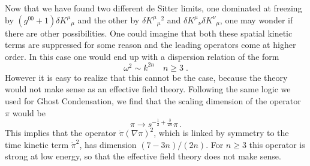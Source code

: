 \documentclass[12pt,letterpaper]{article}
\begin{document}
{%



Now that we have found two different de Sitter limits, one dominated
at freezing by $(g^{00}+1)\delta K^\mu {}_\mu $ and the other by
$\delta K^\mu {}_\mu {}^2$ and $\delta K^\mu {}_\nu \delta K^\nu
{}_\mu$, one may wonder if there are other possibilities. One could
imagine that both these spatial kinetic terms are suppressed for some
reason and the leading operators come at higher order. In this case
one would end up with a dispersion relation of the form
\begin{equation}
\omega^2\sim k^{2n} \quad n \geq 3 \;.
\end{equation}
However it is easy to realize that this cannot be the case, because
the theory would not make sense as an effective field
theory. Following the same logic we used for Ghost Condensation, we
find that the scaling dimension of the operator $\pi$ would be
\begin{equation}
\pi\rightarrow s^{-\frac12+\frac{3}{2n}} \pi \, .
\end{equation}
This implies that the operator $\dot\pi(\nabla\pi)^2$, which is linked
by symmetry to the time kinetic term $\dot\pi^2$, has dimension
$(7-3n)/(2n)$. For $n \geq 3$ this operator is strong at low energy,
so that the effective field theory does not make sense. 












}
\end{document}
